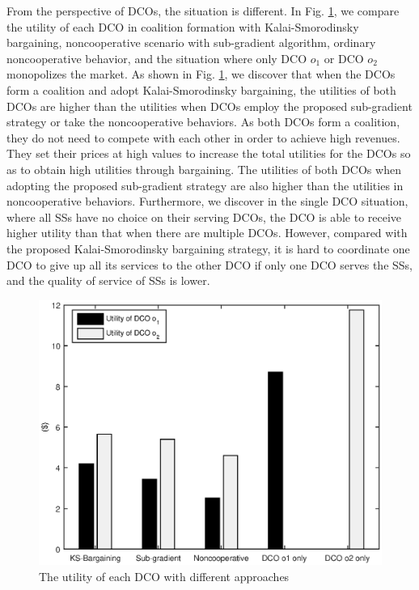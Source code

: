 \documentclass[twocolumn,10pt]{IEEEtran}
\begin{document}
From the perspective of DCOs, the situation is different. In Fig. \ref{fig:utilitydco}, we compare the utility of each DCO in coalition formation with Kalai-Smorodinsky bargaining, noncooperative scenario with sub-gradient algorithm, ordinary noncooperative behavior, and the situation where only DCO $o_1$ or DCO $o_2$ monopolizes the market. As shown in Fig. \ref{fig:utilitydco}, we discover that when the DCOs form a coalition and adopt Kalai-Smorodinsky bargaining, the utilities of both DCOs are higher than the utilities when DCOs employ the proposed sub-gradient strategy or take the noncooperative behaviors. As both DCOs form a coalition, they do not need to compete with each other in order to achieve high revenues. They set their prices at high values to increase the total utilities for the DCOs so as to obtain high utilities through bargaining. The utilities of both DCOs when adopting the proposed sub-gradient strategy are also higher than the utilities in noncooperative behaviors. Furthermore, we discover in the single DCO situation, where all SSs have no choice on their serving DCOs, the DCO is able to receive higher utility than that when there are multiple DCOs. However, compared with the proposed Kalai-Smorodinsky bargaining strategy, it is hard to coordinate one DCO to give up all its services to the other DCO if only one DCO serves the SSs, and the quality of service of SSs is lower.

\begin{figure}[!t]
\centering
\includegraphics[scale=0.42, bb=466 15 34 359]{fig2_utilityDCO.eps}
\caption{The utility of each DCO with different approaches}
\label{fig:utilitydco}
\end{figure}
\end{document}
